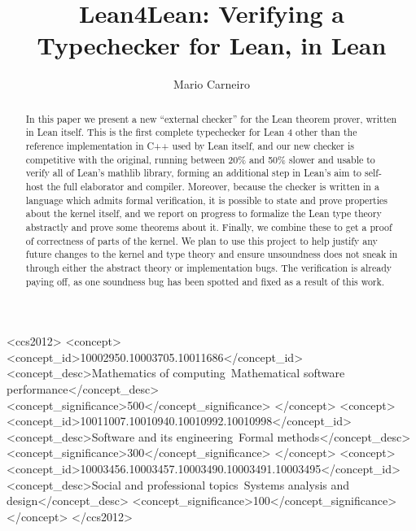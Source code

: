 \documentclass[sigplan,10pt,screen]{acmart}\settopmatter{printfolios=true,printccs=false,printacmref=false}
\begin{document}
\title{Lean4Lean: Verifying a Typechecker for Lean, in Lean}

\author{Mario Carneiro}

\renewcommand{\shortauthors}{M. Carneiro}

\begin{abstract}
In this paper we present a new ``external checker'' for the Lean theorem prover, written in Lean itself. This is the first complete typechecker for Lean 4 other than the reference implementation in C++ used by Lean itself, and our new checker is competitive with the original, running between 20\% and 50\% slower and usable to verify all of Lean's mathlib library, forming an additional step in Lean's aim to self-host the full elaborator and compiler. Moreover, because the checker is written in a language which admits formal verification, it is possible to state and prove properties about the kernel itself, and we report on progress to formalize the Lean type theory abstractly and prove some theorems about it. Finally, we combine these to get a proof of correctness of parts of the kernel. We plan to use this project to help justify any future changes to the kernel and type theory and ensure unsoundness does not sneak in through either the abstract theory or implementation bugs. The verification is already paying off, as one soundness bug has been spotted and fixed as a result of this work.
\end{abstract}

\begin{CCSXML}
<ccs2012>
  <concept>
    <concept_id>10002950.10003705.10011686</concept_id>
    <concept_desc>Mathematics of computing~Mathematical software performance</concept_desc>
    <concept_significance>500</concept_significance>
  </concept>
  <concept>
    <concept_id>10011007.10010940.10010992.10010998</concept_id>
    <concept_desc>Software and its engineering~Formal methods</concept_desc>
    <concept_significance>300</concept_significance>
  </concept>
  <concept>
    <concept_id>10003456.10003457.10003490.10003491.10003495</concept_id>
    <concept_desc>Social and professional topics~Systems analysis and design</concept_desc>
    <concept_significance>100</concept_significance>
  </concept>
</ccs2012>
\end{CCSXML}

\end{document}
